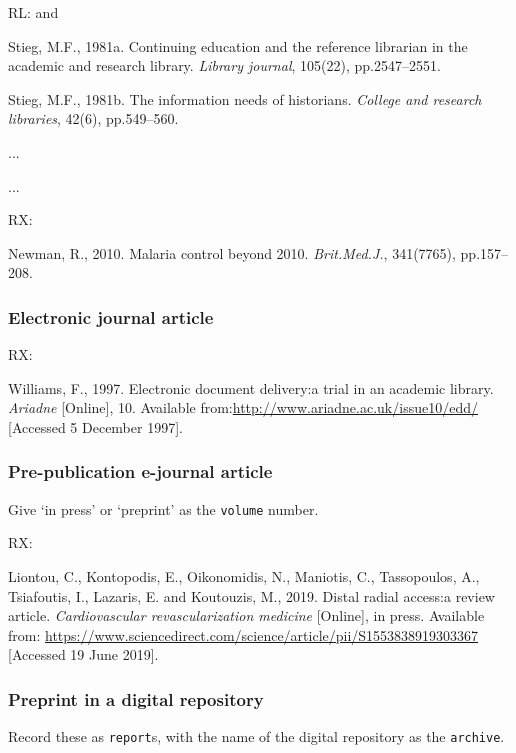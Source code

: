 RL: \cite{stieg1981cer} and \cite{stieg1981inh}

Stieg, M.F., 1981a. Continuing education and the reference librarian in the academic and research library. \emph{Library journal}, 105(22), pp.2547--2551.

Stieg, M.F., 1981b. The information needs of historians. \emph{College and research libraries}, 42(6), pp.549--560.

...


...

RX: \cite{newman2010mcb}

Newman, R., 2010. Malaria control beyond 2010. \emph{Brit.\@ Med.\@ J.}, 341(7765), pp.157--208.



\subsubsection*{Electronic journal article}

RX: \cite{williams1997edd}

Williams, F., 1997. Electronic document delivery:\@ a trial in an academic library. \emph{Ariadne} [Online], 10. Available from:\@ \url{http://www.ariadne.ac.uk/issue10/edd/} [Accessed 5 December 1997].



\subsubsection*{Pre-publication e-journal article}

Give `in press' or `preprint' as the \texttt{volume} number.

RX: \cite{liontou.etal2019dra}

Liontou, C., Kontopodis, E., Oikonomidis, N., Maniotis, C., Tassopoulos, A., Tsiafoutis, I., Lazaris, E. and Koutouzis, M., 2019. Distal radial access:\@ a review article. \emph{Cardiovascular revascularization medicine} [Online], in press. Available from: \url{https://www.sciencedirect.com/science/article/pii/S1553838919303367} [Accessed 19 June 2019].



\subsubsection*{Preprint in a digital repository}

Record these as \texttt{report}s, with the name of the digital repository as the \texttt{archive}.


